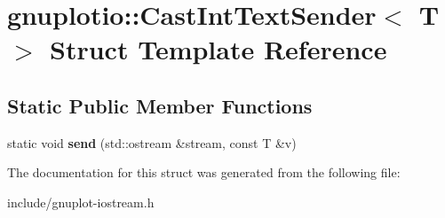 \hypertarget{structgnuplotio_1_1CastIntTextSender}{}\section{gnuplotio\+:\+:Cast\+Int\+Text\+Sender$<$ T $>$ Struct Template Reference}
\label{structgnuplotio_1_1CastIntTextSender}
\subsection*{Static Public Member Functions}
\begin{DoxyCompactItemize}
\item 
\mbox{\label{structgnuplotio_1_1CastIntTextSender_a42733f83f843a375437e7e5f716ea65e}} 
static void {\bfseries send} (std\+::ostream \&stream, const T \&v)
\end{DoxyCompactItemize}


The documentation for this struct was generated from the following file\+:\begin{DoxyCompactItemize}
\item 
include/gnuplot-\/iostream.\+h\end{DoxyCompactItemize}
